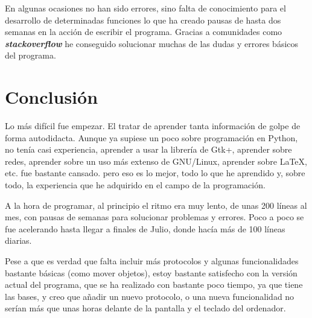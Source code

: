 \documentclass[a4paper, 11pt]{report} %
\begin{document}
En algunas ocasiones no han sido errores, sino falta de conocimiento para el desarrollo de determinadas funciones lo que ha creado pausas de hasta dos semanas en la acción de escribir el programa. Gracias a comunidades como \textbf{\textit{stackoverflow}} he conseguido solucionar muchas de las dudas y errores básicos del programa.

\newpage
\section{Conclusión}
Lo más difícil fue empezar. El tratar de aprender tanta información de golpe de forma autodidacta. Aunque ya supiese un poco sobre programación en Python, no tenía casi experiencia, aprender a usar la librería de Gtk+, aprender sobre redes, aprender sobre un uso más extenso de GNU/Linux, aprender sobre \LaTeX , etc. fue bastante cansado. pero eso es lo mejor, todo lo que he aprendido y, sobre todo, la experiencia que he adquirido en el campo de la programación.

A la hora de programar, al principio el ritmo era muy lento, de unas 200 líneas al mes, con pausas de semanas para solucionar problemas y errores. Poco a poco se fue acelerando hasta llegar a finales de Julio, donde hacía más de 100 líneas diarias.

Pese a que es verdad que falta incluir más protocolos y algunas funcionalidades bastante básicas (como mover objetos), estoy bastante satisfecho con la versión actual del programa, que se ha realizado con bastante poco tiempo, ya que tiene las bases, y creo que añadir un nuevo protocolo, o una nueva funcionalidad no serían más que unas horas delante de la pantalla y el teclado del ordenador.

\glsaddall
\renewcommand{\glsnamefont}[1]{\makefirstuc{#1}}

\nocite{*}
%
\printbibliography[heading=bibintoc]

\appendix
{
\printglossary[type=\acronymtype, style=mcolindex, title=Glosario y acrónimos, toctitle=Glosario y acrónimos]}
\end{document}

